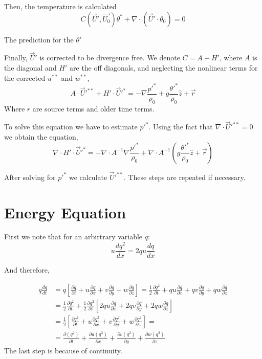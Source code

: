 \documentclass[a4paper,10pt]{article}
\newcommand{\fd}[2]{\frac{d#1}{d#2}}
\newcommand{\pd}[2]{\frac{\partial #1}{\partial #2}}
\newcommand{\Ddt}[1]{\pd{#1}{t} + u\pd{#1}{x} + v\pd{#1}{y} + w\pd{#1}{z}}
\newcommand{\fluxf}[4]{\pd{#1}{t} + \pd{#2#1}{x} + \pd{#3#1}{y} + \pd{#4#1}{z}}
\begin{document}
Then, the temperature is calculated 
\begin{equation}
  C(\vec{U}',\vec{U_0})\theta^* + \nabla\cdot (\vec{U}'\cdot \theta_0) = 0 
\end{equation}

The prediction for the $\theta'$

Finally, $\vec{U}'$ is corrected to be divergence free. 
We denote $C = A + H'$, where $A$ is the diagonal and $H'$ are the off diagonals, 
and neglecting the nonlinear terms for the corrected $u^{**}$ and $w^{**}$, 
\begin{equation}
  A\cdot \vec{U}'^{**} + H'\cdot \vec{U}'^{*} = -\nabla\frac{p'^*}{\rho_0} + g\frac{\theta'^*}{\rho_0}\hat{z} + \vec{r}
\end{equation}
Where $r$ are source terms and older time terms. 

To solve this equation we have to estimate $p'^*$. Using the fact that $\nabla\cdot \vec{U}'^{**} = 0$
we obtain the equation, 
\begin{equation}
  \nabla\cdot H'\cdot \vec{U}'^{*} = -\nabla\cdot A^{-1}\nabla\frac{p'^*}{\rho_0} + \nabla \cdot A^{-1} (g\frac{\theta'^*}{\rho_0}\hat{z} + \vec{r})
\end{equation}

After solving for $p'^*$ we calculate $\vec{U}'^{**}$. These steps are repeated if necessary. 

\section{Energy Equation}


First we note that for an arbirtrary variable $q$: 
\begin{equation}
  u\fd{q^2}{x} = 2qu\fd{q}{x} 
  \label{eqn:firstiden}
\end{equation}

And therefore, 

\begin{equation}
\begin{split}
q\fd{q}{t} & = q\left[\Ddt{q}\right] = \frac{1}{2}\pd{q^2}{t} + qu\pd{q}{x}+ qv\pd{q}{y}+ qw\pd{q}{z} \\
           & = \frac{1}{2}\pd{q^2}{t} + \frac{1}{2}\pd{q^2}{t}\left[2qu\pd{q}{x}+ 2qv\pd{q}{y}+ 2qw\pd{q}{z} \right] \\
           & = \frac{1}{2}\left[\Ddt{q^2}\right] = \\
           & = \fluxf{(q^2)}{u}{v}{w}
\end{split}
\label{eqn:secondiden}
\end{equation}
The last step is because of continuity. 
\end{document}
